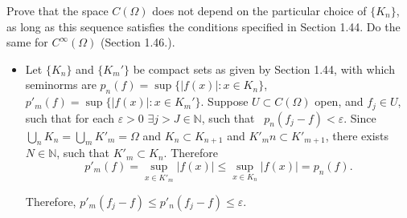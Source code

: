 Prove that the space $C(\Omega)$ does not depend on the particular choice of $\{K_n\}$, as long as this sequence satisfies the conditions specified in Section 1.44. Do the same for $C^\infty(\Omega)$ (Section 1.46.).

\begin{itemize}
    \item Let $\{K_n\}$ and $\{K_m'\}$ be compact sets as given by Section 1.44, with which seminorms are $p_n(f)=\sup\{|f(x)|: x\in K_n\}$, $p'_m(f)=\sup\{|f(x)|: x\in K_m'\}$. Suppose $U\subset C(\Omega)$ open, and $f_j\in U$, such that for each $\varepsilon >0$ $\exists j>J\in \mathbb{N}$, such that \ $p_n(f_j-f) < \varepsilon$. Since $\bigcup_n K_n=\bigcup_m K'_m=\Omega$ and $K_n\subset K_{n+1}$ and $K'_mn\subset K'_{m+1}$, there exists $N\in\mathbb{N}$, such that $K'_m\subset K_n$. Therefore
    $$
    p'_m(f)=\sup_{x\in K'_m}|f(x)|\leq\sup_{x\in K_n}|f(x)|=p_n(f).
    $$

    Therefore, $p'_m(f_j-f)\leq p'_n(f_j-f)\leq\varepsilon$.
\end{itemize}
